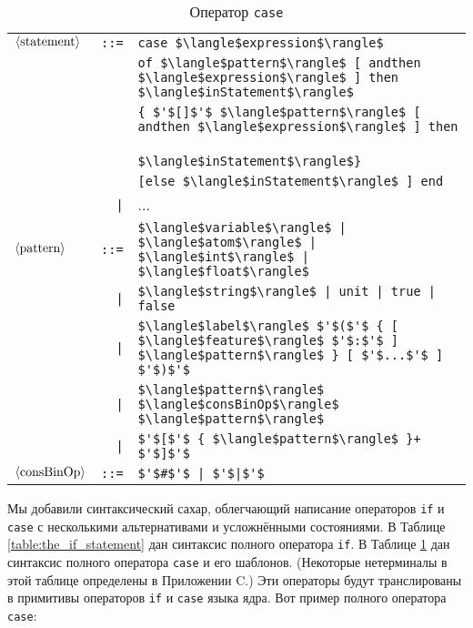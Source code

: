 \begin{table}
  \begin{tabular}{|lrl|}
    \hline
    $\langle \text{\lstinline|statement|} \rangle$ & \lstinline|::=| & \lstinline|case $\langle$expression$\rangle$|\\
    & & \lstinline|of $\langle$pattern$\rangle$ [ andthen $\langle$expression$\rangle$ ] then $\langle$inStatement$\rangle$| \\
    & & \lstinline|{ $'$[]$'$ $\langle$pattern$\rangle$ [ andthen $\langle$expression$\rangle$ ] then| \\
    & & \lstinline!                                               $\langle$inStatement$\rangle$}! \\
    &  & \lstinline|[else $\langle$inStatement$\rangle$ ] end| \\
    & \lstinline!|! & ... \\
    $\langle \text{\lstinline|pattern|} \rangle$ & \lstinline|::=| & \lstinline!$\langle$variable$\rangle$ | $\langle$atom$\rangle$ | $\langle$int$\rangle$ | $\langle$float$\rangle$!\\
    & \lstinline!|! & \lstinline!$\langle$string$\rangle$ | unit | true | false! \\
    & \lstinline!|! & \lstinline!$\langle$label$\rangle$ $'$($'$ { [ $\langle$feature$\rangle$ $'$:$'$ ] $\langle$pattern$\rangle$ } [ $'$...$'$ ] $'$)$'$! \\
    & \lstinline!|! & \lstinline|$\langle$pattern$\rangle$ $\langle$consBinOp$\rangle$ $\langle$pattern$\rangle$| \\
    & \lstinline!|! & \lstinline|$'$[$'$ { $\langle$pattern$\rangle$ }+ $'$]$'$| \\
    $\langle \text{\lstinline|consBinOp|} \rangle$ & \lstinline|::=| & \lstinline!$'$#$'$ | $'$|$'$! \\
    \hline
  \end{tabular}
  
\caption{Оператор \lstinline|case|}
\label{table:the_case_statement}
\end{table}

Мы добавили синтаксический сахар, облегчающий написание операторов \lstinline|if| и \lstinline|case| с несколькими альтернативами и усложнёнными состояниями. В Таблице \ref{table:the_if_statement} дан синтаксис полного оператора \lstinline|if|. В Таблице \ref{table:the_case_statement} дан синтаксис полного оператора \lstinline|case| и его шаблонов. (Некоторые нетерминалы в этой таблице определены в Приложении C.) Эти операторы будут транслированы в примитивы операторов \lstinline|if| и \lstinline|case| языка ядра. Вот пример полного оператора \lstinline|case|:

